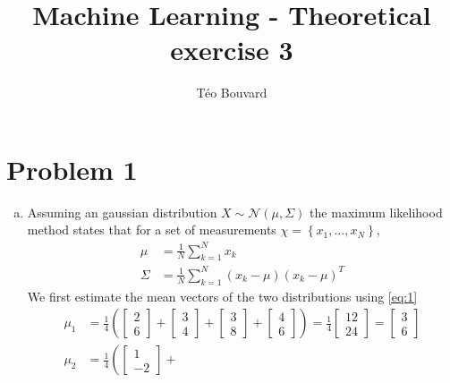 \documentclass[a4paper, 10pt, twoside]{article}
\begin{document}
\title{Machine Learning - Theoretical exercise 3}
\author{T\'eo Bouvard}
\maketitle

\section*{Problem 1}
\begin{enumerate}[a)]
    \item Assuming an gaussian distribution $X \sim \mathcal{N}(\mu, \Sigma)$ the maximum likelihood method states that for a set of measurements $\chi = \left\{x_1, \dots, x_N\right\}$,
          \begin{align}
              \mu    & = \frac{1}{N}\sum_{k=1}^N x_k \label{eq:1}                       \\
              \Sigma & = \frac{1}{N}\sum_{k=1}^N (x_k - \mu) (x_k - \mu)^T \label{eq:2}
          \end{align}
          We first estimate the mean vectors of the two distributions using \eqref{eq:1}
          \begin{align*}
              \mu_1 & = \frac{1}{4}
              \left(
              \begin{bmatrix}2 \\ 6\end{bmatrix} +
              \begin{bmatrix}3 \\ 4\end{bmatrix} +
              \begin{bmatrix}3 \\ 8\end{bmatrix} +
              \begin{bmatrix}4 \\ 6\end{bmatrix}
              \right)
              = \frac{1}{4}\begin{bmatrix}12 \\ 24\end{bmatrix}
              = \begin{bmatrix}3 \\ 6\end{bmatrix}  \\
              \mu_2 & = \frac{1}{4}
              \left(
              \begin{bmatrix}1 \\ -2\end{bmatrix} +

\end{align*}
\end{enumerate}
\end{document}
